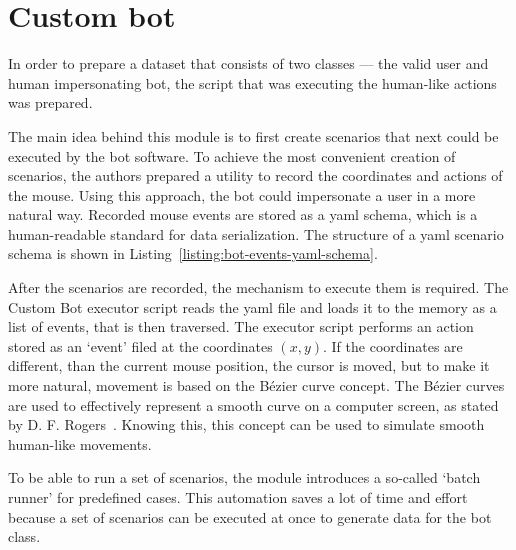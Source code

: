 \section{Custom bot}\label{sec:custom-bot}
In order to prepare a dataset that consists of two classes --- the valid user and human impersonating bot, the script that was executing the human-like actions was prepared.

The main idea behind this module is to first create scenarios that next could be executed by the bot software.
To achieve the most convenient creation of scenarios, the authors prepared a utility to record the coordinates and actions of the mouse.
Using this approach, the bot could impersonate a user in a more natural way.
Recorded mouse events are stored as a \gls{yaml} schema, which is a human-readable standard for data serialization.
The structure of a \gls{yaml} scenario schema is shown in Listing~\ref{listing:bot-events-yaml-schema}.


After the scenarios are recorded, the mechanism to execute them is required.
The Custom Bot executor script reads the \gls{yaml} file and loads it to the memory as a list of events, that is then traversed.
The executor script performs an action stored as an `event' filed at the coordinates $(x, y)$.
If the coordinates are different, than the current mouse position, the cursor is moved, but to make it more natural, movement is based on the Bézier curve concept.
The Bézier curves are used to effectively represent a smooth curve on a computer screen, as stated by D. F. Rogers~\cite{bezier-curves}.
Knowing this, this concept can be used to simulate smooth human-like movements.

To be able to run a set of scenarios, the module introduces a so-called `batch runner' for predefined cases.
This automation saves a lot of time and effort because a set of scenarios can be executed at once to generate data for the bot class.

